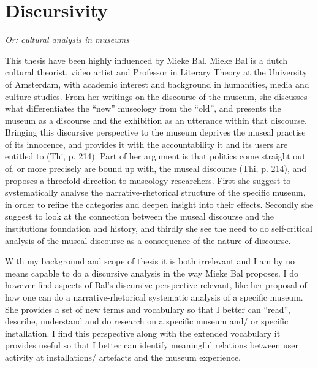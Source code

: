 \section{Discursivity}
\par
\emph{Or: cultural analysis in museums}
\par

This thesis have been highly influenced by Mieke Bal. Mieke Bal is a dutch cultural theorist, video artist and Professor in Literary Theory at the University of Amsterdam, with academic interest and background in humanities, media and culture studies. From her writings on the discourse of the museum, she discusses what differentiates the “new” museology from the “old”, and presents the museum as a discourse and the exhibition as an utterance within that discourse. Bringing this discursive perspective to the museum deprives the museal practise of its innocence, and provides it with the accountability it and its users are entitled to (Thi, p. 214). Part of her argument is that politics come straight out of, or more precisely are bound up with, the museal discourse (Thi, p. 214), and proposes a threefold direction to museology researchers. First she suggest to systematically analyse the narrative-rhetorical structure of the specific museum, in order to refine the categories and deepen insight into their effects. Secondly she suggest to look at the connection between the museal discourse and the institutions foundation and history, and thirdly she see the need to do self-critical analysis of the museal discourse as a consequence of the nature of discourse.

With my background and scope of thesis it is both irrelevant and I am by no means capable to do a discursive analysis in the way Mieke Bal proposes. I do however find aspects of Bal’s discursive perspective relevant, like her proposal of how one can do a narrative-rhetorical systematic analysis of a specific museum. She provides a set of new terms and vocabulary so that I better can “read”, describe, understand and do research on a specific museum and/ or specific installation. I find this perspective along with the extended vocabulary it provides useful so that I better can identify meaningful relations between user activity at installations/ artefacts and the museum experience.


